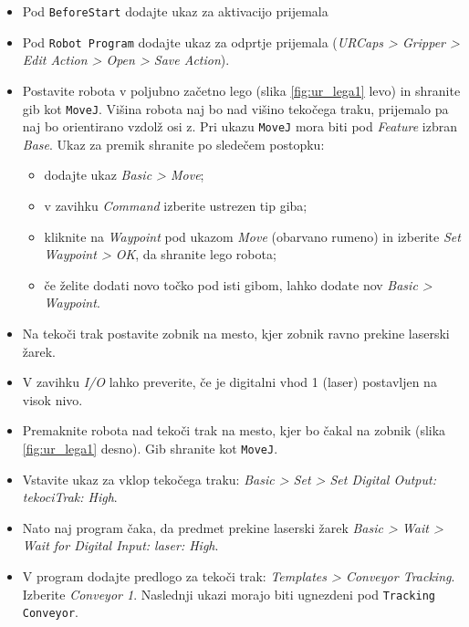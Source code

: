 \begin{mdframed}[backgroundcolor=yellow!20, shadow=true,roundcorner=8pt]
\begin{itemize}
  \item Pod \verb"BeforeStart" dodajte ukaz za aktivacijo prijemala
  \item Pod \verb"Robot Program" dodajte ukaz za odprtje prijemala (\emph{URCaps > Gripper > Edit Action > Open > Save Action}).
  \item Postavite robota v poljubno začetno lego (slika \ref{fig:ur_lega1} levo) in shranite gib kot \verb"MoveJ". Višina robota naj bo nad višino tekočega traku, prijemalo pa naj bo orientirano vzdolž osi z. Pri ukazu \verb"MoveJ" mora biti pod \emph{Feature} izbran \emph{Base}. Ukaz za premik shranite po sledečem postopku:
      \begin{itemize}
        \item dodajte ukaz \emph{Basic > Move};
        \item v zavihku \emph{Command} izberite ustrezen tip giba;
        \item kliknite na \emph{Waypoint} pod ukazom \emph{Move} (obarvano rumeno) in izberite \emph{Set Waypoint > OK}, da shranite lego robota;
        \item če želite dodati novo točko pod isti gibom, lahko dodate nov \emph{Basic > Waypoint}.
      \end{itemize}
  \item Na tekoči trak postavite zobnik na mesto, kjer zobnik ravno prekine laserski žarek.
    \item  V zavihku \emph{I/O} lahko preverite, če je digitalni vhod 1 (laser) postavljen na visok nivo.
  \item Premaknite robota nad tekoči trak na mesto, kjer bo čakal na zobnik (slika \ref{fig:ur_lega1} desno). Gib shranite kot \verb"MoveJ".
%
%
%
  \item Vstavite ukaz za vklop tekočega traku: \emph{Basic > Set > Set Digital Output: tekociTrak: High}.
  \item Nato naj program čaka, da predmet prekine laserski žarek \emph{Basic > Wait > Wait for Digital Input: laser: High}.
  \item V program dodajte predlogo za tekoči trak:  \emph{Templates > Conveyor Tracking}. Izberite \emph{Conveyor 1}. Naslednji ukazi morajo biti ugnezdeni pod \verb"Tracking Conveyor".

\end{itemize}
\end{mdframed}
